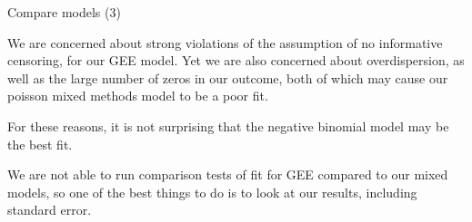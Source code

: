 \documentclass[ignorenonframetext,]{beamer}
\begin{document}
\begin{frame}{Compare models (3)}

\small
We are concerned about strong violations of the assumption of no
informative censoring, for our GEE model. Yet we are also concerned
about overdispersion, as well as the large number of zeros in our
outcome, both of which may cause our poisson mixed methods model to be a
poor fit.

\vspace{12pt}

For these reasons, it is not surprising that the negative binomial model
may be the best fit.

\vspace{12pt}

We are not able to run comparison tests of fit for GEE compared to our
mixed models, so one of the best things to do is to look at our results,
including standard error.

\end{frame}
\end{document}
